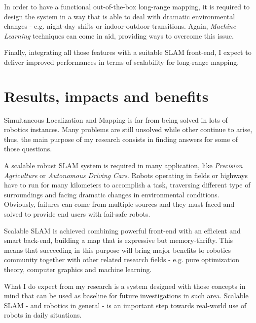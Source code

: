 \documentclass[10pt,a4paper, notitlepage]{report}
\begin{document}
In order to have a functional out-of-the-box long-range mapping, it is required to design the system in a way that is able to deal with dramatic environmental changes - e.g. night-day shifts or indoor-outdoor transitions. Again, \textit{Machine Learning} techniques can come in aid, providing ways to overcome this issue.

Finally, integrating all those features with a suitable SLAM front-end, I expect to deliver improved performances in terms of scalability for long-range mapping.

\section*{Results, impacts and benefits}
Simultaneous Localization and Mapping is far from being solved in lots of robotics instances. Many problems are still unsolved while other continue to arise, thus, the main purpose of my research consists in finding answers for some of those questions. 

A scalable robust SLAM system is required in many application, like \textit{Precision Agriculture} or \textit{Autonomous Driving Cars}. Robots operating in fields or highways have to run for many kilometers to accomplish a task, traversing different type of surroundings and facing dramatic changes in environmental conditions. Obviously, failures can come from multiple sources and they must faced and solved to provide end users with fail-safe robots.

Scalable SLAM is achieved combining powerful front-end with an efficient and smart back-end, building a map that is expressive but memory-thrifty. This means that succeeding in this purpose will bring major benefits to robotics community together with other related research fields - e.g. pure optimization theory, computer graphics and machine learning.

What I do expect from my research is a system designed with those concepts in mind that can be used as baseline for future investigations in such area. Scalable SLAM - and robotics in general - is an important step towards real-world use of robots in daily situations.






\end{document}
